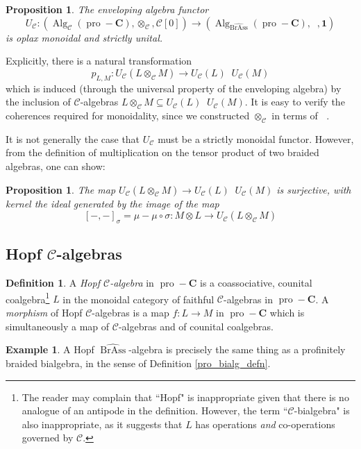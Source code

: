 \documentclass[12pt]{article}
\DeclareMathOperator{\Alg}{Alg}
\DeclareMathOperator{\pro}{pro}
\DeclareMathOperator{\BrAss}{BrAss}
\DeclareMathOperator{\hattimes}{\widehat{\otimes}}
\newcommand{\BrAsshat}{\widehat{\BrAss}} %
\newcommand{\CC} {\mathcal{C}}
\newcommand{\bC} {\mathbf{C}}
\newcommand{\one} {\mathbf{1}}
\newcommand{\proC}{\pro\!-\bC}
\theoremstyle{plain}
\newtheorem{prop}[thm]{Proposition}
\theoremstyle{definition}
\newtheorem{defn}[thm]{Definition}
\newtheorem{exmp}[thm]{Example}
\theoremstyle{remark}
\begin{document}
\begin{prop} \label{env_oplax_prop} The enveloping algebra functor 
%
$$U_{\CC}: (\Alg_{\CC}(\proC), \otimes_{\CC}, \CC[0]) \longrightarrow (\Alg_{\BrAsshat}(\proC), \hattimes, \one)$$
%
is oplax monoidal and strictly unital.

\end{prop}

Explicitly, there is a natural transformation
%
$$p_{L, M}: U_{\CC}(L \otimes_{\CC} M) \to U_{\CC}(L) \hattimes U_{\CC}(M)$$
%
which is induced (through the universal property of the enveloping algebra) by the inclusion of $\CC$-algebras $L \otimes_{\CC} M \subseteq U_{\CC}(L) \hattimes U_{\CC}(M)$.  It is easy to verify the coherences required for monoidality, since we constructed $\otimes_{\CC}$ in terms of $\hattimes$.

It is not generally the case that $U_{\CC}$ must be a strictly monoidal functor.  However, from the definition of multiplication on the tensor product of two braided algebras, one can show: 

\begin{prop}

The map $U_{\CC}(L \otimes_{\CC} M) \to U_{\CC}(L) \hattimes U_{\CC}(M)$ is surjective, with kernel the ideal generated by  the image of the map
%
$$[-, -]_{\sigma} = \mu - \mu \circ \sigma: M \otimes L \to U_{\CC}(L \otimes_{\CC} M)$$

\end{prop}

\subsection{Hopf $\CC$-algebras} \label{Hopf_C_section}

\begin{defn} \label{hopf_c_defn} A \emph{Hopf $\CC$-algebra} in $\proC$ is a coassociative, counital coalgebra\footnote{The reader may complain that ``Hopf" is inappropriate given that there is no analogue of an antipode in the definition.  However, the term ``$\CC$-bialgebra" is also inappropriate, as it suggests that $L$ has operations \emph{and} co-operations governed by $\CC$.} $L$ in the monoidal category of faithful $\CC$-algebras in $\proC$. A \emph{morphism} of Hopf $\CC$-algebras is a map $f: L \to M$ in $\proC$ which is simultaneously a map of $\CC$-algebras and of counital coalgebras.\end{defn} 

\begin{exmp} A Hopf $\BrAsshat$-algebra is precisely the same thing as a profinitely braided bialgebra, in the sense of Definition \ref{pro_bialg_defn}. \end{exmp}
\end{document}
